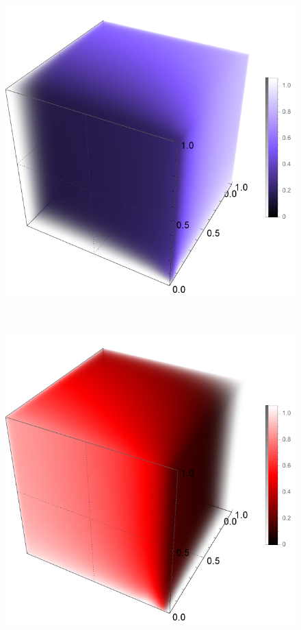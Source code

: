 \begin{figure}
	\centering
	\begin{minipage}{.3\textwidth}
		\includegraphics[width=1\linewidth]{figures/nucleon_strong_red_densityplot1}
	\end{minipage}~
	\begin{minipage}{.3\textwidth}
		\includegraphics[width=1\linewidth]{figures/nucleon_strong_red_densityplot2}

\end{minipage}
\end{figure}
